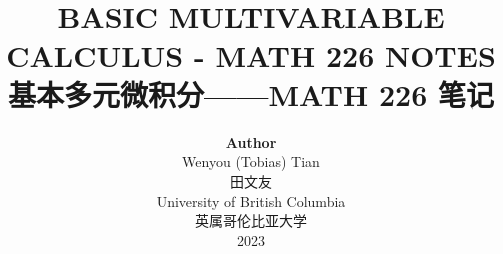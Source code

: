 
\title{ \normalsize \textsc{}
		\\ [2.0cm]
		\HRule{1.5pt} \\
		\LARGE \textbf{\uppercase{Basic Multivariable Calculus - MATH 226 Notes}
		\HRule{2.0pt} \\ [0.6cm] \LARGE{基本多元微积分——MATH 226 笔记} \vspace*{10\baselineskip}}
		}
\date{}
\author{\textbf{Author} \\ 
		Wenyou (Tobias) Tian \\ 田文友 \\
		University of British Columbia \\ 英属哥伦比亚大学 \\
		2023}

\maketitle
\newpage

\tableofcontents
\newpage